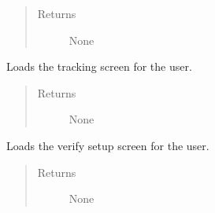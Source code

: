 \documentclass[letterpaper,10pt,english]{sphinxmanual}
\begin{document}
\begin{fulllineitems}
\begin{fulllineitems}
\begin{quote}
\begin{description}
\item[{Returns}] \leavevmode
None

\end{description}\end{quote}

\end{fulllineitems}


\begin{fulllineitems}
\label{\detokenize{index:src.Controllers.Program_Controller.Controller.show_tracking_window}}
Loads the tracking screen for the user.
\begin{quote}\begin{description}
\item[{Returns}] \leavevmode
None

\end{description}\end{quote}

\end{fulllineitems}


\begin{fulllineitems}
\label{\detokenize{index:src.Controllers.Program_Controller.Controller.show_verify_screen}}
Loads the verify setup screen for the user.
\begin{quote}\begin{description}
\item[{Returns}] \leavevmode
None

\end{description}\end{quote}

\end{fulllineitems}



\end{fulllineitems}
\end{document}
